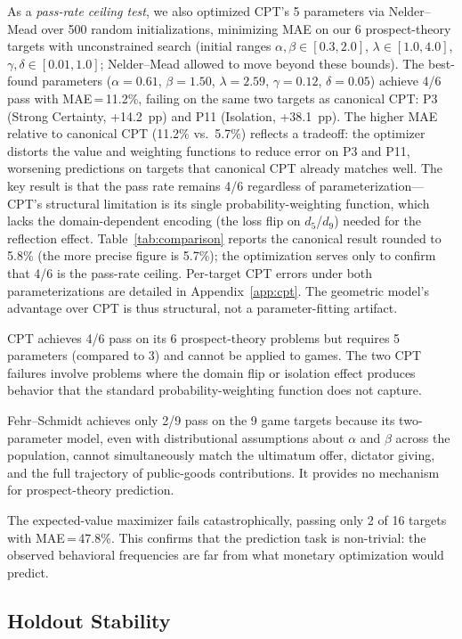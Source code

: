 \documentclass[journal]{IEEEtran}
\begin{document}
As a \emph{pass-rate ceiling test}, we also optimized CPT's 5 parameters via Nelder--Mead over 500 random initializations, minimizing MAE on our 6 prospect-theory targets with unconstrained search (initial ranges $\alpha, \beta \in [0.3, 2.0]$, $\lambda \in [1.0, 4.0]$, $\gamma, \delta \in [0.01, 1.0]$; Nelder--Mead allowed to move beyond these bounds).
The best-found parameters ($\alpha = 0.61$, $\beta = 1.50$, $\lambda = 2.59$, $\gamma = 0.12$, $\delta = 0.05$) achieve 4/6 pass with MAE\,=\,11.2\%, failing on the same two targets as canonical CPT: P3 (Strong Certainty, +14.2~pp) and P11 (Isolation, +38.1~pp).
The higher MAE relative to canonical CPT (11.2\% vs.\ 5.7\%) reflects a tradeoff: the optimizer distorts the value and weighting functions to reduce error on P3 and P11, worsening predictions on targets that canonical CPT already matches well.
The key result is that the pass rate remains 4/6 regardless of parameterization---CPT's structural limitation is its single probability-weighting function, which lacks the domain-dependent encoding (the loss flip on $d_5$/$d_9$) needed for the reflection effect.
Table~\ref{tab:comparison} reports the canonical result rounded to 5.8\% (the more precise figure is 5.7\%); the optimization serves only to confirm that 4/6 is the pass-rate ceiling.
Per-target CPT errors under both parameterizations are detailed in Appendix~\ref{app:cpt}.
The geometric model's advantage over CPT is thus structural, not a parameter-fitting artifact.

CPT achieves 4/6 pass on its 6 prospect-theory problems but requires 5 parameters (compared to 3) and cannot be applied to games.
The two CPT failures involve problems where the domain flip or isolation effect produces behavior that the standard probability-weighting function does not capture.

Fehr--Schmidt achieves only 2/9 pass on the 9 game targets because its two-parameter model, even with distributional assumptions about $\alpha$ and $\beta$ across the population, cannot simultaneously match the ultimatum offer, dictator giving, and the full trajectory of public-goods contributions.
It provides no mechanism for prospect-theory prediction.

The expected-value maximizer fails catastrophically, passing only 2 of 16 targets with MAE\,=\,47.8\%.
This confirms that the prediction task is non-trivial: the observed behavioral frequencies are far from what monetary optimization would predict.

\subsection{Holdout Stability}
\end{document}
